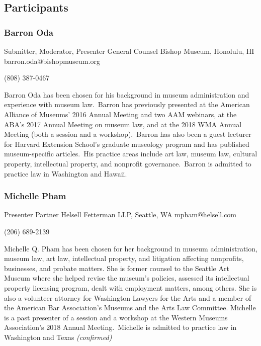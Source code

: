 \documentclass{report}
\begin{document}
            \subsection*{Participants}
              \subsubsection*{ Barron Oda }
              Submitter, Moderator, Presenter\newline
              General Counsel\newline
              Bishop Museum, Honolulu, HI
              \newline
              barron.oda@bishopmuseum.org\newline
              
              (808) 387-0467\newline

              Barron Oda has been chosen for his background in museum administration and experience with museum law. Barron has previously presented at the American Alliance of Museums’ 2016 Annual Meeting and two AAM webinars, at the ABA’s 2017 Annual Meeting on museum law, and at the 2018 WMA Annual Meeting (both a session and a workshop). Barron has also been a guest lecturer for Harvard Extension School’s graduate museology program and has published museum-specific articles. His practice areas include art law, museum law, cultural property, intellectual property, and nonprofit governance. Barron is admitted to practice law in Washington and Hawaii.\newline


              

              
                \subsubsection*{ Michelle  Pham }
                Presenter\newline
                Partner\newline
                Helsell Fetterman LLP, Seattle, WA
                \newline
                mpham@helsell.com\newline
                
                (206) 689-2139\newline

                Michelle Q. Pham has been chosen for her background in museum administration, museum law, art law, intellectual property, and litigation affecting nonprofits, businesses, and probate matters. She is former counsel to the Seattle Art Museum where she helped revise the museum’s policies, assessed its intellectual property licensing program, dealt with employment matters, among others. She is also a volunteer attorney for Washington Lawyers for the Arts and a member of the American Bar Association’s Museums and the Arts Law Committee. Michelle is a past presenter of a session and a workshop at the Western Museums Association’s 2018 Annual Meeting. Michelle is admitted to practice law in Washington and Texas
                \emph{ (confirmed) }
              
\end{document}
